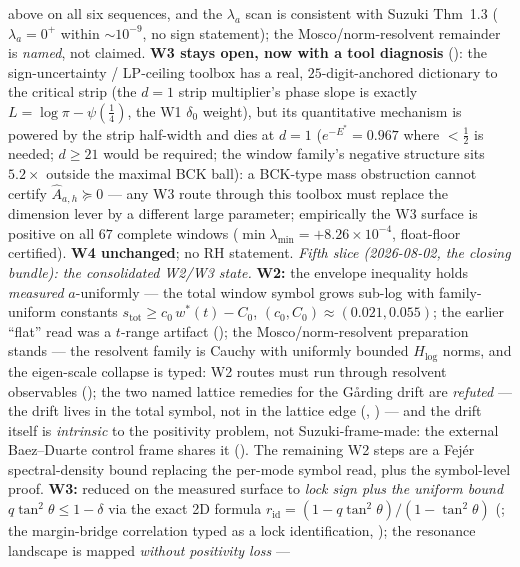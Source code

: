 \documentclass[11pt,a4paper]{article}
\begin{document}
above on all six sequences, and the $\lambda_a$ scan is consistent
with Suzuki Thm~1.3 ($\lambda_a=0^+$ within ${\sim}10^{-9}$, no sign
statement); the Mosco/norm-resolvent remainder is \emph{named}, not
claimed.  \textbf{W3 stays open, now with a tool diagnosis}
(): the sign-uncertainty /
LP-ceiling toolbox has a real, $25$-digit-anchored dictionary to the
critical strip (the $d=1$ strip multiplier's phase slope is exactly
$L=\log\pi-\psi(\tfrac14)$, the W1 $\delta_0$ weight), but its
quantitative mechanism is powered by the strip half-width and dies at
$d=1$ ($e^{-E^*}=0.967$ where $<\tfrac12$ is needed; $d\ge21$ would be
required; the window family's negative structure sits $5.2\times$
outside the maximal BCK ball): a BCK-type mass obstruction cannot
certify $\widehat A_{a,h}\succeq0$ --- any W3 route through this
toolbox must replace the dimension lever by a different large
parameter; empirically the W3 surface is positive on all $67$
complete windows ($\min\lambda_{\min}=+8.26\times10^{-4}$, float-floor
certified).  \textbf{W4 unchanged}; no RH statement.
\emph{Fifth slice (2026-08-02, the closing bundle): the consolidated
W2/W3 state.}  \textbf{W2:} the envelope inequality holds
\emph{measured} $a$-uniformly --- the total window symbol grows
sub-log with family-uniform constants
$s_{\mathrm{tot}}\ge c_0\,w^*(t)-C_0$, $(c_0,C_0)\approx(0.021,
0.055)$; the earlier ``flat'' read was a $t$-range artifact
(); the Mosco/norm-resolvent
preparation stands --- the resolvent family is Cauchy with uniformly
bounded $H_{\log}$ norms, and the eigen-scale collapse is typed: W2
routes must run through resolvent observables
(); the two named lattice remedies for the
G\aa rding drift are \emph{refuted} --- the drift lives in the total
symbol, not in the lattice edge (,
) --- and the drift itself is
\emph{intrinsic} to the positivity problem, not Suzuki-frame-made:
the external Baez--Duarte control frame shares it
().  The remaining W2 steps are a
Fej\'er spectral-density bound replacing the per-mode symbol read,
plus the symbol-level proof.  \textbf{W3:} reduced on the measured
surface to \emph{lock sign plus the uniform bound}
$q\tan^2\theta\le1-\delta$ via the exact 2D formula
$r_{\mathrm{id}}=(1-q\tan^2\theta)/(1-\tan^2\theta)$
(; the margin-bridge correlation typed
as a lock identification, ); the
resonance landscape is mapped \emph{without positivity loss} ---
\end{document}
